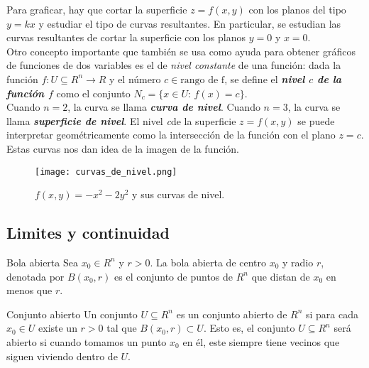 \documentclass[a4paper, twoside]{article}
\numberwithin{equation}{section}
\numberwithin{figure}{section}
\numberwithin{table}{section}
\begin{document}
\begin{minipage}{0.6\textwidth}		
	Para graficar, hay que cortar la superficie $z=f(x,y)$ con los planos del tipo $y=kx$ y estudiar el tipo de curvas resultantes.
	En particular, se estudian las curvas resultantes de cortar la superficie con los planos $y=0$ y $x=0$.\\
	
	Otro concepto importante que también se usa como ayuda para obtener gráficos de funciones de dos variables es el de \emph{nivel constante} de una función: dada la función $f:U\subseteq R^n \rightarrow R$ y el número $c\in\mbox{rango de f}$, se define el \emph{\textbf{nivel $c$ de la función $f$}} como el conjunto $N_{c} = \{ x \in U:\, f \left( x \right) = c\}.$\\
	
	Cuando $n=2$, la curva se llama \textit{\textbf{curva de nivel}}. 
	Cuando $n=3$, la curva se llama \textit{\textbf{superficie de nivel}}. 
	El nivel \textit{c}de la superficie $z=f\left(x,y\right)$ se puede interpretar geométricamente como la intersección de la función con el plano $z=c$.
	Estas curvas nos dan idea de la imagen de la función.
\end{minipage}					
\begin{minipage}{0.3\textwidth}
	\begin{figure}[H]
		\centering
		\texttt{[image: curvas\_de\_nivel.png]}
		\caption{$f(x,y)=-x^2-2y^2$ y sus curvas de nivel.}
	\end{figure}
\end{minipage}

\subsection{Limites y continuidad}
\begin{definicion*}{Bola abierta}
	Sea $x_0\in R^n$ y $r>0$.
	La bola abierta de centro $x_0$ y radio $r$, denotada por $B\left(x_0,r\right)$ es el conjunto de puntos de $R^n$ que distan de $x_0$ en menos que $r$.
\end{definicion*}

\begin{definicion*}{Conjunto abierto}
	Un conjunto $U\subseteq R^n$ es un conjunto abierto de $R^n$ si para cada $x_0\in U$ existe un $r>0$ tal que $B\left(x_0,r\right)\subset U$.
	Esto es, el conjunto $U\subseteq R^n$ será abierto si cuando tomamos un punto $x_0$ en él, este siempre tiene vecinos que siguen viviendo dentro de $U$.\\
\end{definicion*}
\end{document}
